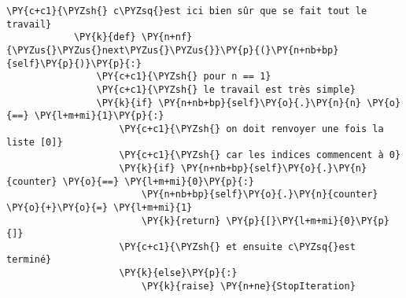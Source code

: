 \begin{Verbatim}[commandchars=\\\{\},frame=single,framerule=0.3mm,rulecolor=\color{cellframecolor}]
            \PY{c+c1}{\PYZsh{} c\PYZsq{}est ici bien sûr que se fait tout le travail}
            \PY{k}{def} \PY{n+nf}{\PYZus{}\PYZus{}next\PYZus{}\PYZus{}}\PY{p}{(}\PY{n+nb+bp}{self}\PY{p}{)}\PY{p}{:}
                \PY{c+c1}{\PYZsh{} pour n == 1}
                \PY{c+c1}{\PYZsh{} le travail est très simple}
                \PY{k}{if} \PY{n+nb+bp}{self}\PY{o}{.}\PY{n}{n} \PY{o}{==} \PY{l+m+mi}{1}\PY{p}{:}
                    \PY{c+c1}{\PYZsh{} on doit renvoyer une fois la liste [0]}
                    \PY{c+c1}{\PYZsh{} car les indices commencent à 0}
                    \PY{k}{if} \PY{n+nb+bp}{self}\PY{o}{.}\PY{n}{counter} \PY{o}{==} \PY{l+m+mi}{0}\PY{p}{:} 
                        \PY{n+nb+bp}{self}\PY{o}{.}\PY{n}{counter} \PY{o}{+}\PY{o}{=} \PY{l+m+mi}{1}
                        \PY{k}{return} \PY{p}{[}\PY{l+m+mi}{0}\PY{p}{]}
                    \PY{c+c1}{\PYZsh{} et ensuite c\PYZsq{}est terminé}
                    \PY{k}{else}\PY{p}{:}
                        \PY{k}{raise} \PY{n+ne}{StopIteration}
        

\end{Verbatim}
